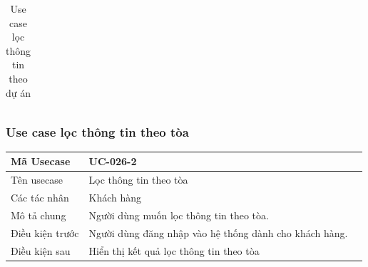 \documentclass[12pt,a4paper]{article}
\begin{document}
\begin{table}[H]
\begin{tabular}{|p{3.5cm}|p{11.5cm}|c|}
            \\ \hline
        \end{tabular}
        \caption{Use case lọc thông tin theo dự án}

    \end{table}



    \subsubsection*{Use case lọc thông tin theo tòa}
    \begin{table}[H]
        \centering
        \begin{tabular}{|p{3.5cm}|p{11.5cm}|c|}
            \hline
            Mã Usecase      & UC-026-2                                               \\
            \hline
            Tên usecase     & Lọc thông tin theo tòa                                 \\
            \hline
            Các tác nhân    & Khách hàng                                             \\
            \hline
            Mô tả chung     & Người dùng muốn lọc thông tin theo tòa.                \\
            \hline

            Điều kiện trước & Người dùng đăng nhập vào hệ thống dành cho khách hàng. \\
            \hline

            Điều kiện sau   & Hiển thị kết quả lọc thông tin theo tòa                \\
            \hline


\end{tabular}
\end{table}
\end{document}
